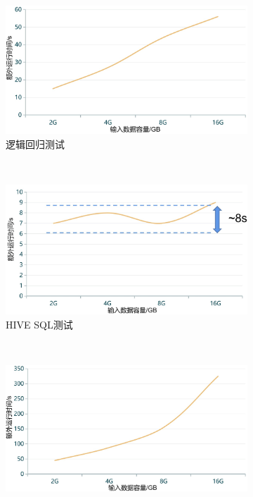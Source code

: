 \begin{figure}
    \centering
    \begin{subfigure}[b]{0.45\linewidth}
      \includegraphics[width=\textwidth]{Img/lr2.jpg}
      \caption{逻辑回归测试}
      \label{fig:lr-ac-2}
    \end{subfigure}%
    ~%
    \begin{subfigure}[b]{0.45\linewidth}
      \includegraphics[width=\textwidth]{Img/hive2.jpg}
      \caption{HIVE SQL测试}
      \label{fig:hive-ac-2}
    \end{subfigure}
    \\%
    \begin{subfigure}[b]{0.45\linewidth}
      \includegraphics[width=\textwidth]{Img/pg2.jpg}

\end{subfigure}
\end{figure}
